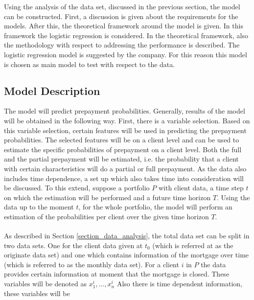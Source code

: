 Using the analysis of the data set, discussed in the previous 
section, the model can be constructed. First, a discussion is given 
about the requirements for the models. After this, the theoretical 
framework around the model is given. In this framework the logistic 
regression is considered. In the theoretical framework, also the 
methodology with respect to addressing the performance is described.
The logistic regression model is suggested by the company. 
For this reason this model is chosen as main model to test with respect 
to the data.  

\subsection{Model Description} \label{subsec_model_descr}
    The model will predict prepayment probabilities. 
    Generally, results of the model will be obtained in the following 
    way. 
    First, there is a variable selection. Based on this variable
    selection, certain features will be used in predicting the prepayment  
    probabilities. The selected features will be on a client level and 
    can be used to estimate the specific probabilities of prepayment 
    on a client level. Both the full and the partial prepayment will 
    be estimated, i.e. the probability that a client with certain 
    characteristics will do a partial or full prepayment. 
    As the data also includes time dependence, a set up which also 
    takes time into consideration will be discussed. To this extend, 
    suppose a portfolio $P$ with client data, a time step $t$ on 
    which the estimation will be performed and a future time horizon $T$. 
    Using the data up to the moment $t$, for the whole portfolio, 
    the model will perform an estimation of the probabilities per 
    client over the given time horizon $T$. 
    \\\\ 
    As described in Section \ref{section_data_analysis}, 
    the total data set can be split in two data sets. One for the 
    client data given at $t_0$ (which is referred at as
    the originate data set) and one which contains information of 
    the mortgage over time (which is referred to as the monthly 
    data set). For a client $i$ in $P$ the data provides certain 
    information at moment that the mortgage is closed. These variables
    will be denoted as  $x_1^i, \ldots, x_n^i$ 
    Also there is time dependent information, these variables will be 
